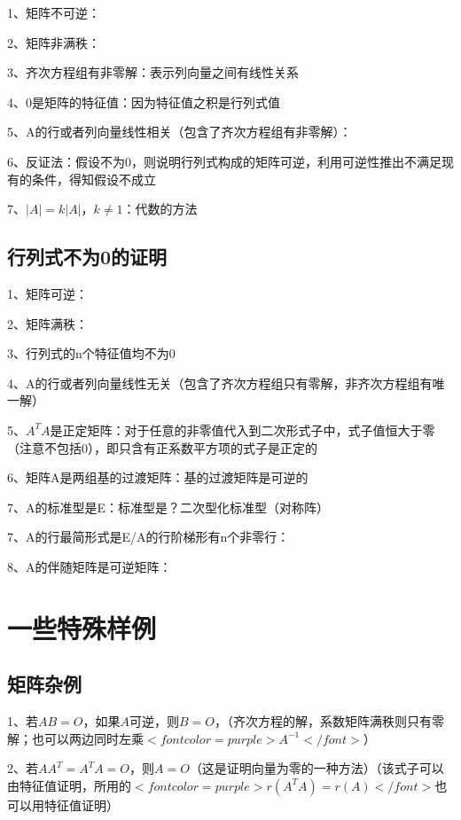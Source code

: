 1、矩阵不可逆：

2、矩阵非满秩：

3、齐次方程组有非零解：表示列向量之间有线性关系

4、0是矩阵的特征值：因为特征值之积是行列式值

5、A的行或者列向量线性相关（包含了齐次方程组有非零解）：

6、反证法：假设不为0，则说明行列式构成的矩阵可逆，利用可逆性推出不满足现有的条件，得知假设不成立

7、$ |A|=k|A| $，$ k\ne 1 $：代数的方法



\subsection{行列式不为0的证明}

1、矩阵可逆：

2、矩阵满秩：

3、行列式的n个特征值均不为0

4、A的行或者列向量线性无关（包含了齐次方程组只有零解，非齐次方程组有唯一解）

5、$ A^TA $是正定矩阵：对于任意的非零值代入到二次形式子中，式子值恒大于零（注意不包括0），即只含有正系数平方项的式子是正定的

6、矩阵A是两组基的过渡矩阵：基的过渡矩阵是可逆的

7、A的标准型是E：标准型是？二次型化标准型（对称阵）

7、A的行最简形式是E/A的行阶梯形有n个非零行：

8、A的伴随矩阵是可逆矩阵：

\section{一些特殊样例}



\subsection{矩阵杂例}

1、若$ AB=O $，如果$ A $可逆，则$ B=O $，（齐次方程的解，系数矩阵满秩则只有零解；也可以两边同时左乘$ <font color=purple>A^{-1}</font> $）

2、若$ AA^T=A^TA=O $，则$ A=O $（这是证明向量为零的一种方法）（该式子可以由特征值证明，所用的$ <font color=purple>r(A^TA)=r(A)</font> $也可以用特征值证明）



